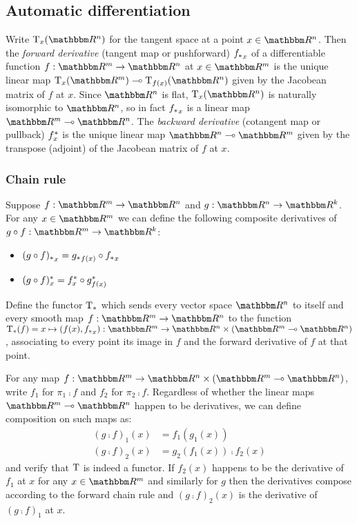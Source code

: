 \subsection{Automatic differentiation}

Write $\tangents_x(\RR^n)$ for the tangent space at a point $x \in \RR^n$. Then the \emph{forward derivative}
(tangent map or pushforward) ${f_{*}}_x$ of a differentiable function $f: \RR^m \to \RR^n$ at $x \in \RR^m$
is the unique linear map $\tangents_x(\RR^m) \linearto \tangents_{f(x)}(\RR^n)$ given by the Jacobean matrix
of $f$ at $x$. Since $\RR^n$ is flat, $\tangents_x(\RR^n)$ is naturally isomorphic to $\RR^n$, so in fact
${f_{*}}_x$ is a linear map $\RR^m \linearto \RR^n$. The \emph{backward derivative} (cotangent map or
pullback) $f^{*}_x$ is the unique linear map $\RR^n \linearto \RR^m$ given by the transpose (adjoint) of
the Jacobean matrix of $f$ at $x$.

\subsubsection{Chain rule}

Suppose $f: \RR^m \to \RR^n$ and $g: \RR^n \to \RR^k$. For any $x \in \RR^m$ we can define the following
composite derivatives of $g \comp f: \RR^m \to \RR^k$:

\begin{itemize}
\item ${(g \circ f)_{*}}_x = {g_{*}}_{f(x)} \circ {f_{*}}_x$
\item $(g \circ f)^{*}_x = f^{*}_{x} \circ g^{*}_{f(x)}$
\end{itemize}

\begin{definition}
Define the functor $\mathrm{T}_*$ which sends every vector space $\RR^n$ to itself and every smooth map $f:
\RR^m \to \RR^n$ to the function $\tangents_*(f) = x \mapsto (f(x), \pushf{f}_x): \RR^m \to \RR^n \times (\RR^m
\linearto \RR^n)$, associating to every point its image in $f$ and the forward derivative of $f$ at that
point.
\end{definition}

For any map $f: \RR^m \to \RR^n \times (\RR^m \linearto \RR^n)$, write $f_1$ for $\pi_1 \comp f$ and $f_2$ for
$\pi_2 \comp f$. Regardless of whether the linear maps $\RR^m \linearto \RR^n$ happen to be derivatives, we
can define composition on such maps as:
\begin{align*}
(g \comp f)_1(x) &= f_1(g_1(x)) \\
(g \comp f)_2(x) &= g_2(f_1(x)) \comp f_2(x)
\end{align*}
\noindent and verify that $\mathrm{T}$ is indeed a functor. If $f_2(x)$ happens to be the derivative of $f_1$
at $x$ for any $x \in \RR^m$ and similarly for $g$ then the derivatives compose according to the forward chain
rule and $(g \comp f)_2(x)$ is the derivative of $(g \comp f)_1$ at $x$.

